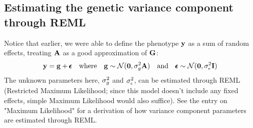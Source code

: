 \documentclass[12pt]{article}
\begin{document}
\subsection{Estimating the genetic variance component through REML}
Notice that earlier, we were able to define the phenotype $\mathbf{y}$ as a sum of random effects, treating $\mathbf{A}$ as a good approximation of $\mathbf{G}$:
\begin{equation*}
\mathbf{y} = \mathbf{g} + \pmb{\epsilon}
\quad\mathrm{where}\quad
\mathbf{g} \sim \mathcal{N}(\textbf{0}, \sigma_g^2 \mathbf{A} )
\quad\mathrm{and}\quad
\pmb{\epsilon} \sim \mathcal{N}(\textbf{0}, \sigma_{\epsilon}^2 \mathbf{I} )
\end{equation*}
The unknown parameters here, $\sigma_g^2$ and $\sigma_{\epsilon}^2$, can be estimated through REML (Restricted Maximum Likelihood; since this model doesn't include any fixed effects, simple Maximum Likelihood would also suffice). See the entry on "Maximum Likelihood" for a derivation of how variance component parameters are estimated through REML.
\end{document}
